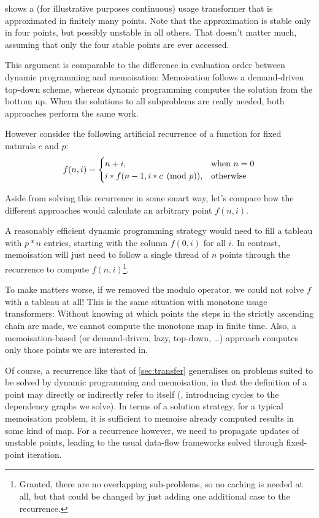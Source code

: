  shows a (for illustrative purposes continuous) usage transformer that is approximated in finitely many points. 
Note that the approximation is stable only in four points, but possibly unstable in all others.
That doesn't matter much, assuming that only the four stable points are ever accessed.\smallskip

This argument is comparable to the difference in evaluation order between dynamic programming and memoisation: 
Memoisation follows a demand-driven top-down scheme, whereas dynamic programming computes the solution from the bottom up.
When the solutions to all subproblems are really needed, both approaches perform the same work.

However consider the following artificial recurrence of a function for fixed naturals $c$ and $p$:
\[
  f(n, i) = \begin{cases}
    n+i, & \text{when } n = 0 \\
    i*f(n-1, i*c\tpmod{p}), & \text{otherwise}
  \end{cases}
\]

Aside from solving this recurrence in some smart way, let's compare how the different approaches would calculate an arbitrary point $f(n,i)$.

A reasonably efficient dynamic programming strategy would need to fill a tableau with $p*n$ entries, starting with the column $f(0,i)$ for all $i$.
In contrast, memoisation will just need to follow a single thread of $n$ points through the recurrence to compute $f(n,i)$\footnote{Granted, there are no overlapping sub-problems, so no caching is needed at all, but that could be changed by just adding one additional case to the recurrence.}.

To make matters worse, if we removed the modulo operator, we could not solve $f$ with a tableau at all!
This is the same situation with monotone usage transformers: 
Without knowing at which points the steps in the strictly ascending chain are made, we cannot compute the monotone map in finite time.
Also, a memoisation-based (or demand-driven, lazy, top-down, \dots) approach computes only those points we are interested in.

Of course, a recurrence like that of \cref{sec:transfer} generalises on problems suited to be solved by dynamic programming and memoisation, in that the definition of a point may directly or indirectly refer to itself (\eg, introducing cycles to the dependency graphs we solve).
In terms of a solution strategy, for a typical memoisation problem, it is sufficient to memoise already computed results in some kind of map. 
For a recurrence however, we need to propagate updates of unstable points, leading to the usual data-flow frameworks solved through fixed-point iteration.

